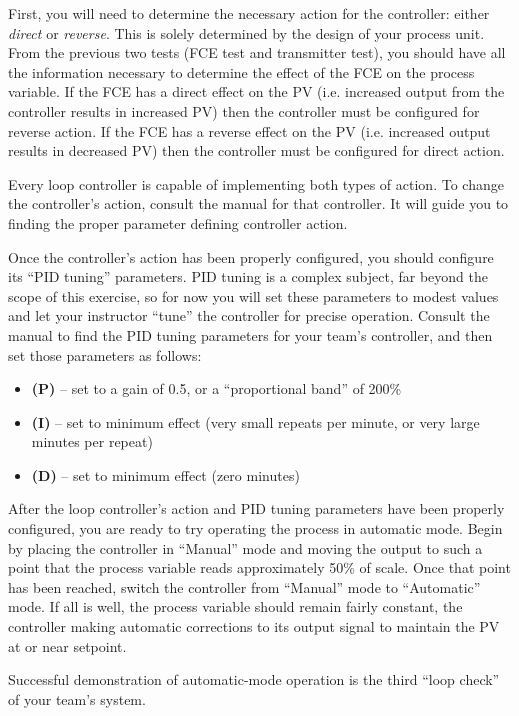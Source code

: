First, you will need to determine the necessary action for the controller: either {\it direct} or {\it reverse}.  This is solely determined by the design of your process unit.  From the previous two tests (FCE test and transmitter test), you should have all the information necessary to determine the effect of the FCE on the process variable.  If the FCE has a direct effect on the PV (i.e. increased output from the controller results in increased PV) then the controller must be configured for reverse action.  If the FCE has a reverse effect on the PV (i.e. increased output results in decreased PV) then the controller must be configured for direct action.

Every loop controller is capable of implementing both types of action.  To change the controller's action, consult the manual for that controller.  It will guide you to finding the proper parameter defining controller action.

Once the controller's action has been properly configured, you should configure its ``PID tuning'' parameters.  PID tuning is a complex subject, far beyond the scope of this exercise, so for now you will set these parameters to modest values and let your instructor ``tune'' the controller for precise operation.  Consult the manual to find the PID tuning parameters for your team's controller, and then set those parameters as follows:

\begin{itemize}
\item{} {\bf (P)} -- set to a gain of 0.5, or a ``proportional band'' of 200\%
\item{} {\bf (I)} -- set to minimum effect (very small repeats per minute, or very large minutes per repeat)
\item{} {\bf (D)} -- set to minimum effect (zero minutes)
\end{itemize}

After the loop controller's action and PID tuning parameters have been properly configured, you are ready to try operating the process in automatic mode.  Begin by placing the controller in ``Manual'' mode and moving the output to such a point that the process variable reads approximately 50\% of scale.  Once that point has been reached, switch the controller from ``Manual'' mode to ``Automatic'' mode.  If all is well, the process variable should remain fairly constant, the controller making automatic corrections to its output signal to maintain the PV at or near setpoint.

Successful demonstration of automatic-mode operation is the third ``loop check'' of your team's system.

